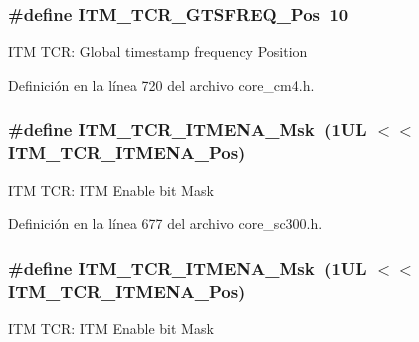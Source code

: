 \subsubsection[{\texorpdfstring{I\+T\+M\+\_\+\+T\+C\+R\+\_\+\+G\+T\+S\+F\+R\+E\+Q\+\_\+\+Pos}{ITM_TCR_GTSFREQ_Pos}}]{\setlength{\rightskip}{0pt plus 5cm}\#define I\+T\+M\+\_\+\+T\+C\+R\+\_\+\+G\+T\+S\+F\+R\+E\+Q\+\_\+\+Pos~10}\hypertarget{group___c_m_s_i_s___i_t_m_ga96c7c7cbc0d98426c408090b41f583f1}{}\label{group___c_m_s_i_s___i_t_m_ga96c7c7cbc0d98426c408090b41f583f1}
I\+TM T\+CR\+: Global timestamp frequency Position 

Definición en la línea 720 del archivo core\+\_\+cm4.\+h.

\subsubsection[{\texorpdfstring{I\+T\+M\+\_\+\+T\+C\+R\+\_\+\+I\+T\+M\+E\+N\+A\+\_\+\+Msk}{ITM_TCR_ITMENA_Msk}}]{\setlength{\rightskip}{0pt plus 5cm}\#define I\+T\+M\+\_\+\+T\+C\+R\+\_\+\+I\+T\+M\+E\+N\+A\+\_\+\+Msk~(1\+U\+L $<$$<$ I\+T\+M\+\_\+\+T\+C\+R\+\_\+\+I\+T\+M\+E\+N\+A\+\_\+\+Pos)}\hypertarget{group___c_m_s_i_s___i_t_m_ga7dd53e3bff24ac09d94e61cb595cb2d9}{}\label{group___c_m_s_i_s___i_t_m_ga7dd53e3bff24ac09d94e61cb595cb2d9}
I\+TM T\+CR\+: I\+TM Enable bit Mask 

Definición en la línea 677 del archivo core\+\_\+sc300.\+h.

\subsubsection[{\texorpdfstring{I\+T\+M\+\_\+\+T\+C\+R\+\_\+\+I\+T\+M\+E\+N\+A\+\_\+\+Msk}{ITM_TCR_ITMENA_Msk}}]{\setlength{\rightskip}{0pt plus 5cm}\#define I\+T\+M\+\_\+\+T\+C\+R\+\_\+\+I\+T\+M\+E\+N\+A\+\_\+\+Msk~(1\+U\+L $<$$<$ I\+T\+M\+\_\+\+T\+C\+R\+\_\+\+I\+T\+M\+E\+N\+A\+\_\+\+Pos)}\hypertarget{group___c_m_s_i_s___i_t_m_ga7dd53e3bff24ac09d94e61cb595cb2d9}{}\label{group___c_m_s_i_s___i_t_m_ga7dd53e3bff24ac09d94e61cb595cb2d9}
I\+TM T\+CR\+: I\+TM Enable bit Mask 

